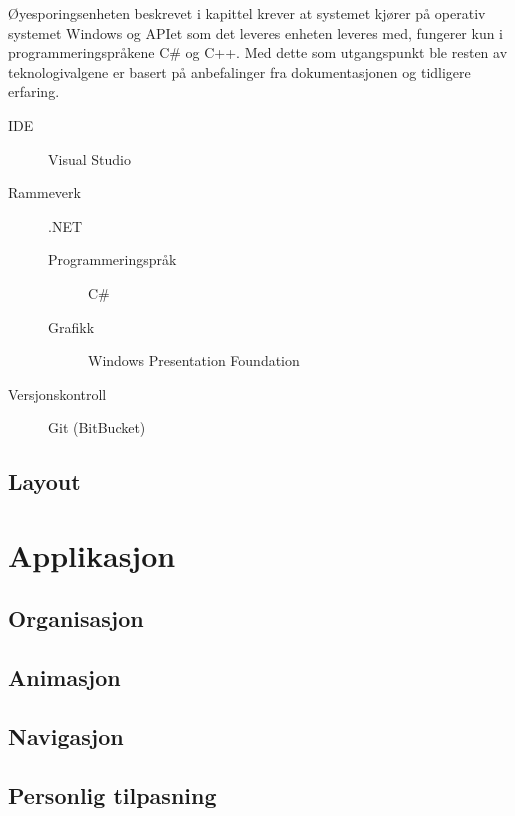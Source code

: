 \documentclass[phd,tocprelim]{cornell}
\begin{document}
Øyesporingsenheten beskrevet i kapittel  krever at systemet kjører på operativ systemet Windows og APIet som det leveres enheten leveres med,  fungerer kun i programmeringspråkene C\# og C++. Med dette som utgangspunkt ble resten av teknologivalgene er basert på anbefalinger fra dokumentasjonen og tidligere erfaring. 

\begin{description}
  \item[IDE] Visual Studio
  \item[Rammeverk] .NET
  \begin{description}
     \item[Programmeringspråk] C\#
     \item[Grafikk] Windows Presentation Foundation 
\end{description}
  \item[Versjonskontroll] Git (BitBucket)
\end{description}



\section{Layout}











\chapter{Applikasjon}

\section{Organisasjon}


\section{Animasjon}

\section{Navigasjon}

\section{Personlig tilpasning}
\end{document}

